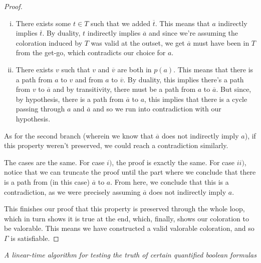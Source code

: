 \documentclass[11pt]{article}
\newcommand{\conj}[1]{\overline{#1}}
\begin{document}
\begin{proof}
\begin{enumerate}[i)]
\item There exists some $t \in T$ such that we added $\conj t$. This means that $a$ indirectly implies $\conj t$. By duality, $t$ indirectly implies $\conj a$ and since we're assuming the coloration induced by $T$ was valid at the outset, we get $\conj a$ must have been in $T$ from the get-go, which contradicts our choice for $a$.

\item There exists $v$ such that $v$ and $\conj v$ are both in $p(a)$. This means that there is a path from $a$ to $v$ and from $a$ to $\conj v$. By duality, this implies there's a path from $v$ to $\conj a$ and by transitivity, there must be a path from $a$ to $\conj a$. But since, by hypothesis, there is a path from $\conj a$ to $a$, this implies that there is a cycle passing through $a$ and $\conj a$ and so we run into contradiction with our hypothesis.
\end{enumerate}

As for the second branch (wherein we know that $\conj a$ does not indirectly imply $a$), if this property weren't preserved, we could reach a contradiction similarly.

The cases are the same. For case $i)$, the proof is exactly the same. For case $ii)$, notice that we can truncate the proof until the part where we conclude that there is a path from (in this case) $\conj a$ to $a$. From here, we conclude that this is a contradiction, as we were precisely assuming $\conj a$ does not indirectly imply $a$.

This finishes our proof that this property is preserved through the whole loop, which in turn shows it is true at the end, which, finally, shows our coloration to be valorable. This means we have constructed a valid valorable coloration, and so $\Gamma$ is satisfiable.
\end{proof}


\begin{thebibliography}{1}

\textit{A linear-time algorithm for testing the truth of certain quantified boolean formulas}

\end{thebibliography}
\end{document}
